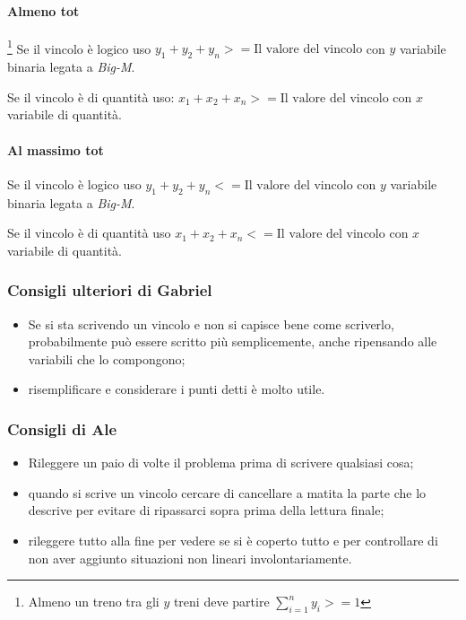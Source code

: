\paragraph{Almeno tot}\footnote{Almeno un treno tra gli $y$ treni deve partire $\sum_{i=1}^{n}y_i >= 1$ } Se il vincolo è logico uso $y_1+y_2+y_n >= \text{Il valore del vincolo}$ con $y$ variabile binaria legata a \textit{Big-M}.

Se il vincolo è di quantità uso: $x_1+x_2+x_n >= \text{Il valore del vincolo}$ con $x$ variabile di quantità.

\paragraph{Al massimo tot} Se il vincolo è logico uso $y_1+y_2+y_n <= \text{Il valore del vincolo}$ con $y$ variabile binaria legata a \textit{Big-M}.

Se il vincolo è di quantità uso $x_1+x_2+x_n <= \text{Il valore del vincolo}$ con $x$ variabile di quantità.

\subsubsection{Consigli ulteriori di Gabriel}
\begin{itemize}
    \item 
    Se si sta scrivendo un vincolo e non si capisce bene come scriverlo, probabilmente può essere scritto più semplicemente, anche ripensando alle variabili che lo compongono;
    \item risemplificare e considerare i punti detti è molto utile.
\end{itemize}


\subsubsection{Consigli di Ale}

\begin{itemize}
    \item Rileggere un paio di volte il problema prima di scrivere qualsiasi cosa;
    \item quando si scrive un vincolo cercare di cancellare a matita la parte che lo descrive per evitare di ripassarci sopra prima della lettura finale;
    \item rileggere tutto alla fine per vedere se si è coperto tutto e per controllare di non aver aggiunto situazioni non lineari involontariamente.
\end{itemize}



